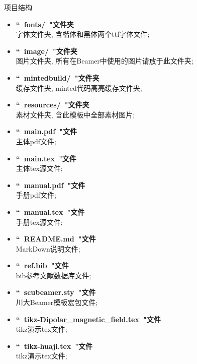 \documentclass[hyperref, UTF8, CJK, aspectratio=169]{beamer}
\begin{document}
\begin{frame}{项目结构}
	\scriptsize
	\begin{multicols}{2}
	\begin{itemize}
		\item \textbf{``~fonts/~"\hfill 文件夹}\\字体文件夹, 含楷体和黑体两个ttf字体文件;
		\item \textbf{``~image/~"\hfill 文件夹}\\图片文件夹, 所有在Beamer中使用的图片请放于此文件夹;
		\item \textbf{``~mintedbuild/~"\hfill 文件夹}\\缓存文件夹, minted代码高亮缓存文件夹;
		\item \textbf{``~resources/~"\hfill 文件夹}\\素材文件夹, 含此模板中全部素材图片;
		\item \textbf{``~main.pdf~"\hfill 文件}\\主体pdf文件;
		\item \textbf{``~main.tex~"\hfill 文件}\\主体tex源文件;
		\item \textbf{``~manual.pdf~"\hfill 文件}\\手册pdf文件;
		\item \textbf{``~manual.tex~"\hfill 文件}\\手册tex源文件;
		\item \textbf{``~README.md~"\hfill 文件}\\MarkDown说明文件;
		\item \textbf{``~ref.bib~"\hfill 文件}\\bib参考文献数据库文件;
		\item \textbf{``~scubeamer.sty~"\hfill 文件}\\川大Beamer模板宏包文件;
		\item \textbf{``~tikz-Dipolar\_magnetic\_field.tex~"\hfill 文件}\\tikz演示tex文件;
		\item \textbf{``~tikz-huaji.tex~"\hfill 文件}\\tikz演示tex文件;
	\end{itemize}
	\end{multicols}
\end{frame}
\end{document}
